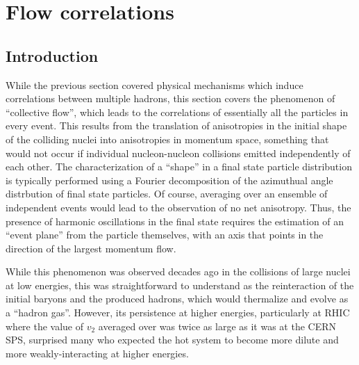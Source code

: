 \section{Flow correlations}
\label{sec:ps:flow}
\subsection{Introduction}
While the previous section covered physical mechanisms which induce
correlations between multiple hadrons, this section covers the
phenomenon of ``collective flow'', which leads to the correlations of
essentially all the particles in every event.
This results from the translation of anisotropies in the initial shape of the
colliding nuclei into anisotropies in momentum space, something that
would not occur if individual nucleon-nucleon collisions emitted independently
of each other.
The characterization of a ``shape'' in a final state particle distribution
is typically performed using a Fourier decomposition of the azimuthual
angle distrbution of final state particles.
Of course, averaging over an ensemble of independent events would lead to
the observation of no net anisotropy.  Thus, the presence of harmonic
oscillations in the final state requires the estimation of an ``event plane''
from the particle themselves, with an axis that points in the direction of
the largest momentum flow.

While this phenomenon was observed decades ago in the collisions of large
nuclei at low energies, this was straightforward to understand as the
reinteraction of the initial baryons and the produced hadrons, which
would thermalize and evolve as a ``hadron gas''.  
However, its persistence at higher energies, particularly at RHIC where the
value of $v_2$ averaged over \pT was twice as large as it was at the 
CERN SPS, surprised many who expected the hot system to become more
dilute and more weakly-interacting at higher energies.


